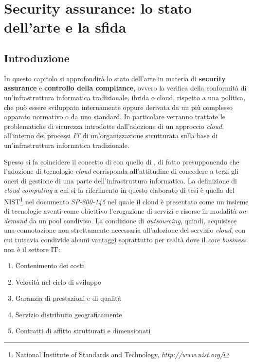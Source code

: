 \documentclass[../main.tex]{subfiles}
\begin{document}
\chapter{Security assurance: lo stato dell'arte e la sfida}
\section{Introduzione}
In questo capitolo si approfondirà lo stato dell'arte in materia di \textbf{security assurance} e \textbf{controllo della compliance}, ovvero la verifica della conformità di un'infrastruttura informatica tradizionale, ibrida o cloud, rispetto a una politica, che può essere sviluppata internamente oppure derivata da un più complesso apparato normativo o da uno standard.
In particolare verranno trattate le problematiche di sicurezza introdotte dall'adozione di un approccio \textit{cloud}, all'interno dei processi \textit{IT} di un'organizzazione strutturata sulla base di un'infrastruttura informatica tradizionale.

Spesso si fa coincidere il concetto di  con quello di , di fatto presupponendo che l'adozione di tecnologie \textit{cloud} corrisponda all'attitudine di concedere a terzi gli oneri di gestione di una parte dell'infrastruttura informatica.
La definizione di \textit{cloud computing} a cui si fa riferimento in questo elaborato di tesi è quella del NIST\footnote{National Institute of Standards and Technology, \textit{http://www.nist.org/}} nel documento \textit{SP-800-145}\cite{NISTCloud} nel quale il cloud è presentato come un insieme di tecnologie aventi come obiettivo l'erogazione di servizi e risorse in modalità \textit{on-demand} da un pool condiviso.
La condizione di \textit{outsourcing}, quindi, acquisisce una connotazione non strettamente necessaria all'adozione del servizio \textit{cloud}, con cui tuttavia condivide alcuni vantaggi\cite{OutsourcingCloud} soprattutto per realtà dove il \textit{core business} non è il settore IT:
\begin{enumerate}
\item Contenimento dei costi
\item Velocità nel ciclo di sviluppo
\item Garanzia di prestazioni e di qualità
\item Servizio distribuito geograficamente
\item Contratti di affitto strutturati e dimensionati
\end{enumerate}
\end{document}
